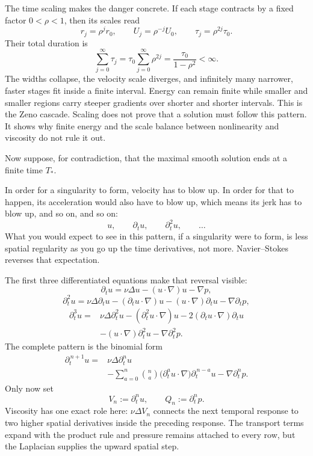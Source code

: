 \documentclass[11pt]{article}
\begin{document}
The time scaling makes the danger concrete. If each stage contracts by a fixed factor \(0<\rho<1\), then its scales read
\[
r_j=\rho^jr_0,
\qquad
U_j=\rho^{-j}U_0,
\qquad
\tau_j=\rho^{2j}\tau_0.
\]
Their total duration is
\[
\sum_{j=0}^{\infty}\tau_j
=\tau_0\sum_{j=0}^{\infty}\rho^{2j}
=\frac{\tau_0}{1-\rho^2}<\infty.
\]
The widths collapse, the velocity scale diverges, and infinitely many narrower, faster stages fit inside a finite interval. Energy can remain finite while smaller and smaller regions carry steeper gradients over shorter and shorter intervals. This is the Zeno cascade. Scaling does not prove that a solution must follow this pattern. It shows why finite energy and the scale balance between nonlinearity and viscosity do not rule it out.

Now suppose, for contradiction, that the maximal smooth solution ends at a finite time \(T_*\).

In order for a singularity to form, velocity has to blow up. In order for that to happen, its acceleration would also have to blow up, which means its jerk has to blow up, and so on, and so on:
\[
u,\qquad \partial_tu,\qquad \partial_t^2u,\qquad \ldots
\]
What you would expect to see in this pattern, if a singularity were to form, is less spatial regularity as you go up the time derivatives, not more. Navier--Stokes reverses that expectation.

The first three differentiated equations make that reversal visible:
\[
\partial_tu
=\nu\Delta u-(u\cdot\nabla)u-\nabla p,
\]
\[
\partial_t^2u
=\nu\Delta\partial_tu
-(\partial_tu\cdot\nabla)u
-(u\cdot\nabla)\partial_tu
-\nabla\partial_tp,
\]
\[
\begin{aligned}
\partial_t^3u={}&\nu\Delta\partial_t^2u
-(\partial_t^2u\cdot\nabla)u
-2(\partial_tu\cdot\nabla)\partial_tu \\
&-(u\cdot\nabla)\partial_t^2u
-\nabla\partial_t^2p.
\end{aligned}
\]
The complete pattern is the binomial form
\[
\begin{aligned}
\partial_t^{\,n+1}u={}&\nu\Delta\partial_t^n u \\
&-\sum_{a=0}^{n}\binom{n}{a}
\bigl(\partial_t^a u\cdot\nabla\bigr)
\partial_t^{\,n-a}u
-\nabla\partial_t^n p.
\end{aligned}
\]
Only now set
\[
V_n:=\partial_t^n u,
\qquad
Q_n:=\partial_t^n p.
\]
Viscosity has one exact role here: \(\nu\Delta V_n\) connects the next temporal response to two higher spatial derivatives inside the preceding response. The transport terms expand with the product rule and pressure remains attached to every row, but the Laplacian supplies the upward spatial step.
\end{document}
